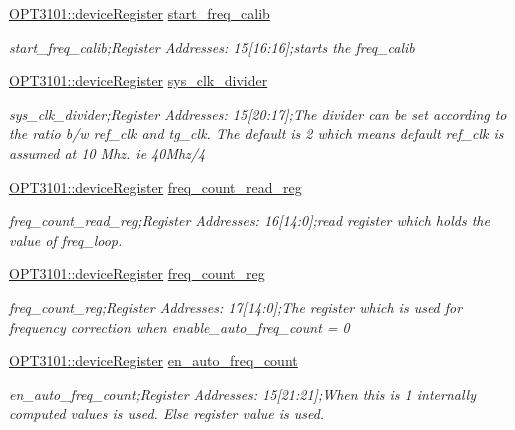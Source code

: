 \begin{DoxyCompactItemize}
\mbox{\hyperlink{class_o_p_t3101_1_1device_register}{O\+P\+T3101\+::device\+Register}} \mbox{\hyperlink{class_o_p_t3101_1_1registers_a50515c2538c13c51a62485ee689c5e1c}{start\+\_\+freq\+\_\+calib}}
\begin{DoxyCompactList}\small\item\em start\+\_\+freq\+\_\+calib;Register Addresses\+: 15\mbox{[}16\+:16\mbox{]};starts the freq\+\_\+calib \end{DoxyCompactList}\item 
\mbox{\hyperlink{class_o_p_t3101_1_1device_register}{O\+P\+T3101\+::device\+Register}} \mbox{\hyperlink{class_o_p_t3101_1_1registers_af4ee9a8bd2c03f0045edee01b1a568ac}{sys\+\_\+clk\+\_\+divider}}
\begin{DoxyCompactList}\small\item\em sys\+\_\+clk\+\_\+divider;Register Addresses\+: 15\mbox{[}20\+:17\mbox{]};The divider can be set according to the ratio b/w ref\+\_\+clk and tg\+\_\+clk. The default is 2 which means default ref\+\_\+clk is assumed at 10 Mhz. ie 40\+Mhz/4 \end{DoxyCompactList}\item 
\mbox{\hyperlink{class_o_p_t3101_1_1device_register}{O\+P\+T3101\+::device\+Register}} \mbox{\hyperlink{class_o_p_t3101_1_1registers_a0d343738560c0bc418f34b458735a811}{freq\+\_\+count\+\_\+read\+\_\+reg}}
\begin{DoxyCompactList}\small\item\em freq\+\_\+count\+\_\+read\+\_\+reg;Register Addresses\+: 16\mbox{[}14\+:0\mbox{]};read register which holds the value of freq\+\_\+loop. \end{DoxyCompactList}\item 
\mbox{\hyperlink{class_o_p_t3101_1_1device_register}{O\+P\+T3101\+::device\+Register}} \mbox{\hyperlink{class_o_p_t3101_1_1registers_a6b28826c31906dc3a27f33b015c4c4d8}{freq\+\_\+count\+\_\+reg}}
\begin{DoxyCompactList}\small\item\em freq\+\_\+count\+\_\+reg;Register Addresses\+: 17\mbox{[}14\+:0\mbox{]};The register which is used for frequency correction when enable\+\_\+auto\+\_\+freq\+\_\+count = \textquotesingle{}0\textquotesingle{} \end{DoxyCompactList}\item 
\mbox{\hyperlink{class_o_p_t3101_1_1device_register}{O\+P\+T3101\+::device\+Register}} \mbox{\hyperlink{class_o_p_t3101_1_1registers_a1c8bf1bb8f6d672bf780e5f99698959d}{en\+\_\+auto\+\_\+freq\+\_\+count}}
\begin{DoxyCompactList}\small\item\em en\+\_\+auto\+\_\+freq\+\_\+count;Register Addresses\+: 15\mbox{[}21\+:21\mbox{]};When this is \textquotesingle{}1\textquotesingle{} internally computed values is used. Else register value is used. \end{DoxyCompactList}\item 

\end{DoxyCompactItemize}
